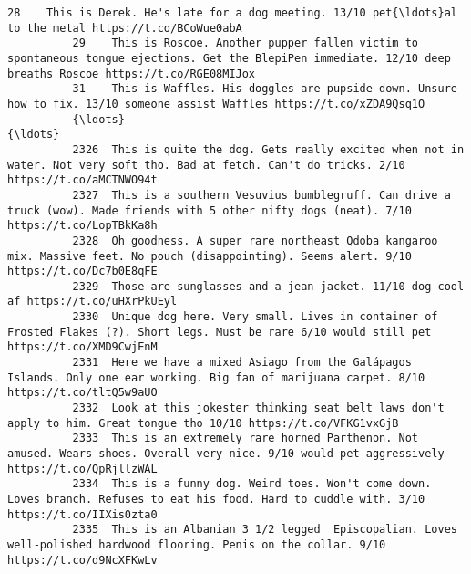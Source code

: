 \documentclass[11pt]{article}
\begin{document}
\begin{Verbatim}[commandchars=\\\{\}]
          28    This is Derek. He's late for a dog meeting. 13/10 pet{\ldots}al to the metal https://t.co/BCoWue0abA                                                                          
          29    This is Roscoe. Another pupper fallen victim to spontaneous tongue ejections. Get the BlepiPen immediate. 12/10 deep breaths Roscoe https://t.co/RGE08MIJox              
          31    This is Waffles. His doggles are pupside down. Unsure how to fix. 13/10 someone assist Waffles https://t.co/xZDA9Qsq1O                                                   
          {\ldots}                                                                                                                      {\ldots}                                                   
          2326  This is quite the dog. Gets really excited when not in water. Not very soft tho. Bad at fetch. Can't do tricks. 2/10 https://t.co/aMCTNWO94t                             
          2327  This is a southern Vesuvius bumblegruff. Can drive a truck (wow). Made friends with 5 other nifty dogs (neat). 7/10 https://t.co/LopTBkKa8h                              
          2328  Oh goodness. A super rare northeast Qdoba kangaroo mix. Massive feet. No pouch (disappointing). Seems alert. 9/10 https://t.co/Dc7b0E8qFE                                
          2329  Those are sunglasses and a jean jacket. 11/10 dog cool af https://t.co/uHXrPkUEyl                                                                                        
          2330  Unique dog here. Very small. Lives in container of Frosted Flakes (?). Short legs. Must be rare 6/10 would still pet https://t.co/XMD9CwjEnM                             
          2331  Here we have a mixed Asiago from the Galápagos Islands. Only one ear working. Big fan of marijuana carpet. 8/10 https://t.co/tltQ5w9aUO                                  
          2332  Look at this jokester thinking seat belt laws don't apply to him. Great tongue tho 10/10 https://t.co/VFKG1vxGjB                                                         
          2333  This is an extremely rare horned Parthenon. Not amused. Wears shoes. Overall very nice. 9/10 would pet aggressively https://t.co/QpRjllzWAL                              
          2334  This is a funny dog. Weird toes. Won't come down. Loves branch. Refuses to eat his food. Hard to cuddle with. 3/10 https://t.co/IIXis0zta0                               
          2335  This is an Albanian 3 1/2 legged  Episcopalian. Loves well-polished hardwood flooring. Penis on the collar. 9/10 https://t.co/d9NcXFKwLv                                 

\end{Verbatim}
\end{document}
